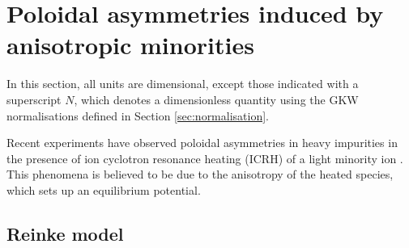 \section{Poloidal asymmetries induced by anisotropic minorities}

In this section, all units are dimensional, except those indicated with a superscript $N$, which denotes 
a dimensionless quantity using the GKW normalisations defined in Section \ref{sec:normalisation}.

Recent experiments have observed poloidal asymmetries in heavy impurities in the presence of ion cyclotron
resonance heating (ICRH) of a light minority ion \cite{Reinke12}.  This phenomena is believed to be due to 
the anisotropy of the heated species, which sets up an equilibrium potential. 

\subsection{Reinke model \label{sec.icrh}}

